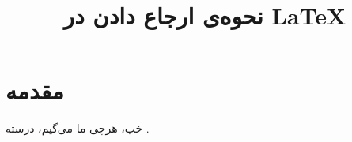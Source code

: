 \documentclass{article}
\begin{document}
\title{نحوه‌ی ارجاع دادن در \LaTeX}
\maketitle
\section{مقدمه}
خب، هرچی ما می‌گیم، درسته \cite{heydari2019low, cheraaqee}.


\end{document}
